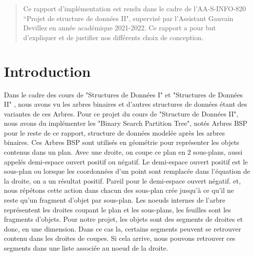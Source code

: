 \documentclass[a4paper,12pt]{report}	%
\begin{document}

	\umonsCoverPage		%
	
	
	\begin{abstract}	%
Ce rapport d'implémentation est rendu dans le cadre de l'AA-S-INFO-820 ``Projet de structure de données II", supervisé par l'Assistant Gauvain Devillez en année académique 2021-2022. Ce rapport a pour but d'expliquer et de justifier nos différents choix de conception.
	\end{abstract}
	
	\clearpage			%
	\tableofcontents
	


	\clearpage			%
	
	{\section*{Introduction}}
\noindent Dans le cadre des cours de "Structures de Données I" et "Structures de Données II" , nous avons vu les arbres binaires et
d'autres structures de données étant des variantes de ces Arbres. Pour ce projet du cours de "Structure de Données II",
nous avons du implémenter les "Binary Search Partition Tree", notés Arbres BSP pour le reste de ce rapport, structure de données
modelée après les arbres binaires. Ces Arbres BSP sont utilisés en géométrie pour représenter les objets contenus dans un plan.
Avec une droite, on coupe ce plan en 2 sous-plans, aussi appelés demi-espace ouvert positif ou négatif.
Le demi-espace ouvert positif est le sous-plan ou lorsque les coordonnées d'un point sont remplacée dans l'équation de la droite, on
a un résultat positif. Pareil pour le demi-espace ouvert négatif.
et, nous répétons cette action dans chacun des sous-plan crée jusqu'à ce qu'il ne reste qu'un fragment d'objet par sous-plan.
Les noeuds internes de l'arbre représentent les droites coupant le plan et les sous-plans, les feuilles sont les fragments d'objets.
Pour notre projet, les objets sont des segments de droites et donc, en une dimension. Dans ce cas la, certains segments
peuvent se retrouver contenu dans les droites de coupes. Si cela arrive, nous pouvons retrouver ces segments dans une liste
associée au noeud de la droite.
\end{document}
